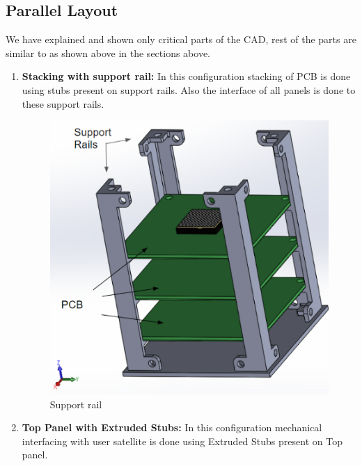 \documentclass[../../main.tex]{subfiles}
\begin{document}
    \subsection{ Parallel Layout}
    \text We have explained and shown only critical parts of the CAD, rest of the parts are similar to as shown above in the sections above.
    \begin{enumerate}
        \item \textbf{Stacking with support rail:} In this configuration stacking of PCB is done using stubs present on support rails. Also the interface of all panels is done to these support rails.
        \begin{figure}[H]
        \centering
        \includegraphics[scale=0.75]{Figures/Mechanical/support_stack.png}
        \caption{Support rail}
        \label{fig:sys_CAD}
    \end{figure}
        \item \textbf{Top Panel with Extruded Stubs:} In this configuration mechanical interfacing with user satellite is done using Extruded Stubs present on Top panel.
        \begin{figure}[H]
            \centering

\end{figure}
\end{enumerate}
\end{document}
